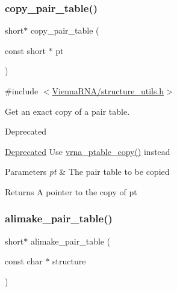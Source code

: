 \subsubsection{\texorpdfstring{copy\+\_\+pair\+\_\+table()}{copy\_pair\_table()}}
{\footnotesize\ttfamily short$\ast$ copy\+\_\+pair\+\_\+table (\begin{DoxyParamCaption}\item[{const short $\ast$}]{pt }\end{DoxyParamCaption})}



{\ttfamily \#include $<$\mbox{\hyperlink{structure__utils_8h}{Vienna\+R\+N\+A/structure\+\_\+utils.\+h}}$>$}



Get an exact copy of a pair table. 

\begin{DoxyRefDesc}{Deprecated}
\item[\mbox{\hyperlink{deprecated__deprecated000141}{Deprecated}}]Use \mbox{\hyperlink{group__struct__utils_ga2daefbbd6d9f8803731651882f54332d}{vrna\+\_\+ptable\+\_\+copy()}} instead\end{DoxyRefDesc}



\begin{DoxyParams}{Parameters}
{\em pt} & The pair table to be copied \\
\hline
\end{DoxyParams}
\begin{DoxyReturn}{Returns}
A pointer to the copy of \textquotesingle{}pt\textquotesingle{} 
\end{DoxyReturn}
\mbox{\label{group__struct__utils_ga3c81b3967056c3888b8472b65fbb16f5}} 
\subsubsection{\texorpdfstring{alimake\+\_\+pair\+\_\+table()}{alimake\_pair\_table()}}
{\footnotesize\ttfamily short$\ast$ alimake\+\_\+pair\+\_\+table (\begin{DoxyParamCaption}\item[{const char $\ast$}]{structure }\end{DoxyParamCaption})}



